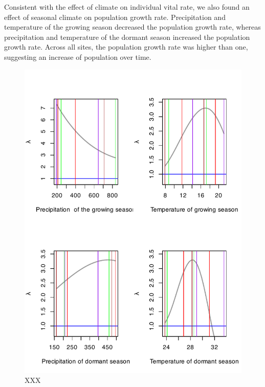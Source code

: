 \documentclass[11pt]{article}
\begin{document}
Consistent with the effect of climate on individual vital rate, we also found an effect of seasonal climate on population growth rate. Precipitation and temperature of the growing season decreased the population growth rate, whereas precipitation and temperature of the dormant season increased the population growth rate. Across all sites, the population growth rate was higher than one, suggesting an increase of population over time.

\begin{figure}%
  \begin{center}
    \includegraphics[width=0.95\linewidth]{Figures/all_lambda.pdf}
  \caption{XXX}
  \label{fig:vital_rates}
  \end{center}
\end{figure}


\newpage
\end{document}
